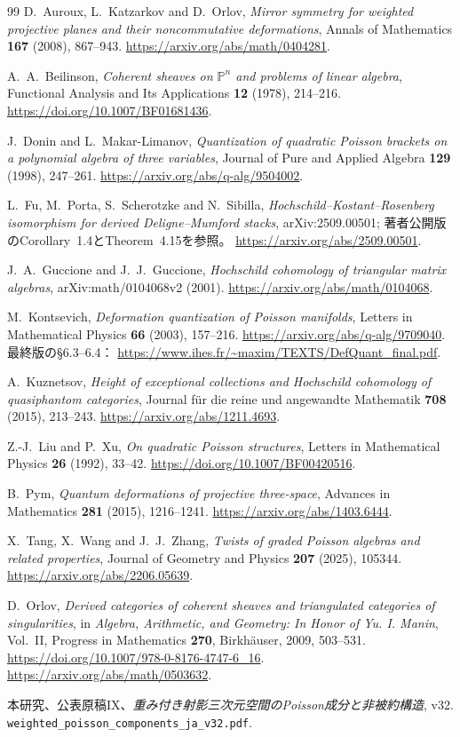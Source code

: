 \begin{thebibliography}{99}
D.~Auroux, L.~Katzarkov and D.~Orlov,
\emph{Mirror symmetry for weighted projective planes and their noncommutative deformations},
Annals of Mathematics \textbf{167} (2008), 867--943.
\url{https://arxiv.org/abs/math/0404281}.

A.~A.~Beilinson,
\emph{Coherent sheaves on $\mathbb P^n$ and problems of linear algebra},
Functional Analysis and Its Applications \textbf{12} (1978), 214--216.
\url{https://doi.org/10.1007/BF01681436}.

J.~Donin and L.~Makar-Limanov,
\emph{Quantization of quadratic Poisson brackets on a polynomial algebra of three variables},
Journal of Pure and Applied Algebra \textbf{129} (1998), 247--261.
\url{https://arxiv.org/abs/q-alg/9504002}.

L.~Fu, M.~Porta, S.~Scherotzke and N.~Sibilla,
\emph{Hochschild--Kostant--Rosenberg isomorphism for derived Deligne--Mumford stacks},
arXiv:2509.00501; 著者公開版のCorollary~1.4とTheorem~4.15を参照。
\url{https://arxiv.org/abs/2509.00501}.

J.~A.~Guccione and J.~J.~Guccione,
\emph{Hochschild cohomology of triangular matrix algebras},
arXiv:math/0104068v2 (2001).
\url{https://arxiv.org/abs/math/0104068}.

M.~Kontsevich,
\emph{Deformation quantization of Poisson manifolds},
Letters in Mathematical Physics \textbf{66} (2003), 157--216.
\url{https://arxiv.org/abs/q-alg/9709040}.
最終版の\S6.3--6.4：
\url{https://www.ihes.fr/~maxim/TEXTS/DefQuant_final.pdf}.

A.~Kuznetsov,
\emph{Height of exceptional collections and Hochschild cohomology of quasiphantom categories},
Journal f\"ur die reine und angewandte Mathematik \textbf{708} (2015), 213--243.
\url{https://arxiv.org/abs/1211.4693}.

Z.-J.~Liu and P.~Xu,
\emph{On quadratic Poisson structures},
Letters in Mathematical Physics \textbf{26} (1992), 33--42.
\url{https://doi.org/10.1007/BF00420516}.

B.~Pym,
\emph{Quantum deformations of projective three-space},
Advances in Mathematics \textbf{281} (2015), 1216--1241.
\url{https://arxiv.org/abs/1403.6444}.

X.~Tang, X.~Wang and J.~J.~Zhang,
\emph{Twists of graded Poisson algebras and related properties},
Journal of Geometry and Physics \textbf{207} (2025), 105344.
\url{https://arxiv.org/abs/2206.05639}.

D.~Orlov, \emph{Derived categories of coherent sheaves and triangulated categories of singularities},
in \emph{Algebra, Arithmetic, and Geometry: In Honor of Yu. I. Manin}, Vol.~II,
Progress in Mathematics \textbf{270}, Birkh\"auser, 2009, 503--531.
\url{https://doi.org/10.1007/978-0-8176-4747-6_16}.
\url{https://arxiv.org/abs/math/0503632}.

本研究、公表原稿IX、\emph{重み付き射影三次元空間のPoisson成分と非被約構造}, v32.
\nolinkurl{weighted_poisson_components_ja_v32.pdf}.
\end{thebibliography}
